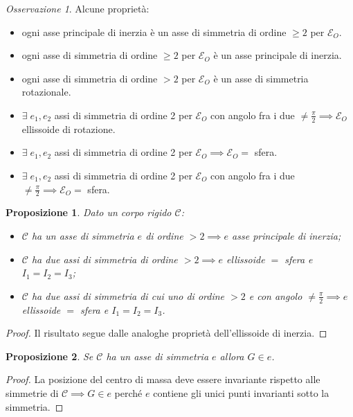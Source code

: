 \documentclass{book}
\theoremstyle{plain}
\theoremstyle{plain}
\theoremstyle{plain}
\theoremstyle{plain}
\theoremstyle{plain}
\newtheorem{prop}{Proposizione}[chapter]
\theoremstyle{definition}
\theoremstyle{remark}
\newtheorem*{oss}{Osservazione}
\theoremstyle{definition}
\begin{document}
\begin{oss}
    Alcune proprietà:
    \begin{itemize}
        \item ogni asse principale di inerzia è un asse di simmetria di ordine $\geq 2$ per $\mathcal{E}_O$.
        \item ogni asse di simmetria di ordine $\geq 2$ per $\mathcal{E}_O$ è un asse principale di inerzia.
        \item ogni asse di simmetria di ordine $> 2$ per $\mathcal{E}_O$ è un asse di simmetria rotazionale.
        \item $\exists \; e_1, e_2$ assi di simmetria di ordine 2 per $\mathcal{E}_O$ con angolo fra i due $\neq \frac{\pi}{2} \implies \mathcal{E}_O$ ellissoide di rotazione.
        \item $\exists \; e_1, e_2$ assi di simmetria di ordine 2 per $\mathcal{E}_O \implies \mathcal{E}_O =$ sfera.
        \item $\exists \; e_1, e_2$ assi di simmetria di ordine 2 per $\mathcal{E}_O$ con angolo fra i due $\neq \frac{\pi}{2} \implies \mathcal{E}_O=$ sfera.
    \end{itemize}
\end{oss}

\begin{prop}
    Dato un corpo rigido $\mathcal{C}$:
    \begin{itemize}
        \item $\mathcal{C}$ ha un asse di simmetria $e$ di ordine $> 2 \implies e$ asse principale di inerzia;
        \item $\mathcal{C}$ ha due assi di simmetria di ordine $> 2 \implies e$ ellissoide $=$ sfera e $I_1=I_2=I_3$;
        \item $\mathcal{C}$ ha due assi di simmetria di cui uno di ordine $> 2$ e con angolo $\neq \frac{\pi}{2}\implies e$ ellissoide $=$ sfera e $I_1=I_2=I_3$.
    \end{itemize}
\end{prop}

\begin{proof}
    Il risultato segue dalle analoghe proprietà dell'ellissoide di inerzia.
\end{proof}

\begin{prop}
    Se $\mathcal{C}$ ha un asse di simmetria $e$ allora $G \in e$.
\end{prop}

\begin{proof}
    La posizione del centro di massa deve essere invariante rispetto alle simmetrie di $\mathcal{C} \implies G \in e$ perché $e$ contiene gli unici punti invarianti sotto la simmetria.
\end{proof}
\end{document}
